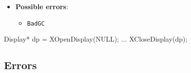 \documentclass{report}
\begin{document}
\begin{itemize}
\begin{itemize}
                \item \textbf{Possible errors}:
                    \begin{itemize}
                        \item \texttt{BadGC}
                    \end{itemize}
            \end{itemize}
            \bigbreak \noindent 
            \begin{cppcode}
            Display* dp = XOpenDisplay(NULL);
            ...
            XCloseDisplay(dp);
            \end{cppcode}


    \end{itemize}

    \pagebreak 
    \subsection{Errors}
\end{document}
